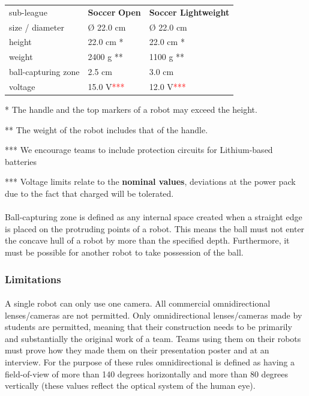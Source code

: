 \documentclass{article}
\newcommand*{\p}{\paragraph{}}
\begin{document}
\begin{table}
\begin{tabularx}{\textwidth}{
p{}
p{}
p{}}
sub-league & \textbf{Soccer} \textbf{Open} & \textbf{Soccer Lightweight} \\
size / diameter & \O{} 22.0 cm & \O{} 22.0 cm \\
height & 22.0 cm * & 22.0 cm * \\
weight & 2400 g ** & 1100 g ** \\
ball-capturing zone & 2.5 cm & 3.0 cm \\
voltage & 15.0 V\textcolor{red}{***} & 12.0 V\textcolor{red}{***} \\

\end{tabularx}

\end{table}

* The handle and the top markers of a robot may exceed the height.

** The weight of the robot includes that of the handle.

*** We encourage teams to include protection circuits for Lithium-based
batteries

*** Voltage limits relate to the \textbf{nominal values}, deviations at the power pack
due to the fact that charged will be tolerated.

\p Ball-capturing zone is defined as any internal space created when a straight
edge is placed on the protruding points of a robot. This means the ball must
not enter the concave hull of a robot by more than the specified depth.
Furthermore, it must be possible for another robot to take possession of the
ball.

\subsubsection{Limitations\label{ref-056}}

\p A single robot can only use one camera. All commercial omnidirectional
lenses/cameras are not permitted. Only omnidirectional lenses/cameras made by
students are permitted, meaning that their construction needs to be primarily
and substantially the original work of a team. Teams using them on their robots
must prove how they made them on their presentation poster and at an interview.
For the purpose of these rules omnidirectional is defined as having a
field-of-view of more than 140 degrees horizontally and more than 80 degrees
vertically (these values reflect the optical system of the human eye).
\end{document}
